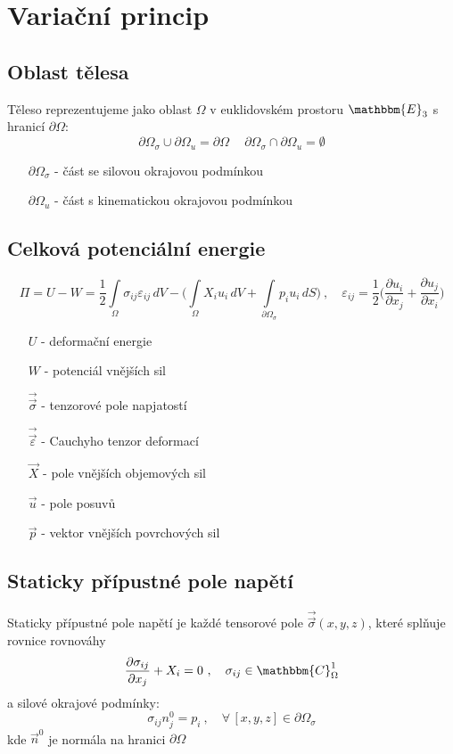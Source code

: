 \documentclass[10pt,oneside]{article}
\newcommand{\tenz}[1]{\vec{\vec{#1}}}
\begin{document}
\section*{Variační princip}
\subsection*{Oblast tělesa}

Těleso reprezentujeme jako oblast $\Omega$ v euklidovském prostoru $\mathbbm{E}_3$ s hranicí $\partial\Omega$:
%
\begin{equation*}
	\partial\Omega_\sigma \cup \partial\Omega_u = \partial\Omega \ \quad \partial\Omega_\sigma \cap \partial\Omega_u = \emptyset
\end{equation*}
%
\begin{itemize}
	\item[$\partial\Omega_\sigma$] - část se silovou okrajovou podmínkou
	\item[$\partial\Omega_u$] - část s kinematickou okrajovou podmínkou
\end{itemize}

\subsection*{Celková potenciální energie}
%
\begin{equation*}
	\Pi = U - W = \frac{1}{2}\int\limits_\Omega \sigma_{ij} \varepsilon_{ij} \,dV - \Bigg( \int\limits_\Omega X_i u_i \,dV + \int\limits_{\partial\Omega_\sigma} p_i u_i \,dS \Bigg)
	\ ,\quad
	\varepsilon_{ij} = \frac{1}{2} \bigg(\frac{\partial u_i}{\partial x_j} + \frac{\partial u_j}{\partial x_i} \bigg)
\end{equation*}
%
\begin{itemize}
	\item[$U$] - deformační energie
	\item[$W$] - potenciál vnějších sil
	\item[$\tenz{\sigma}$] - tenzorové pole napjatostí
	\item[$\tenz{\varepsilon}$] - Cauchyho tenzor deformací
	\item[$\vec{X}$] - pole vnějších objemových sil
	\item[$\vec{u}$] - pole posuvů
	\item[$\vec{p}$] - vektor vnějších povrchových sil
\end{itemize}

\subsection*{Staticky přípustné pole napětí}
%
Staticky přípustné pole napětí je každé tensorové pole $\tenz{\sigma}(x,y,z)$, které splňuje rovnice rovnováhy
%
\begin{equation*}
	\frac{\partial \sigma_{ij}}{\partial x_j} + X_i = 0 \ ,\quad \sigma_{ij} \in \mathbbm{C}^1_\Omega
\end{equation*}
%
a silové okrajové podmínky:
%
\begin{equation*}
	\sigma_{ij} n^0_j = p_i \ ,\quad \forall\,[x,y,z] \in \partial\Omega_\sigma
\end{equation*}
%
kde $\vec{n}^0$ je normála na hranici $\partial\Omega$
\end{document}
